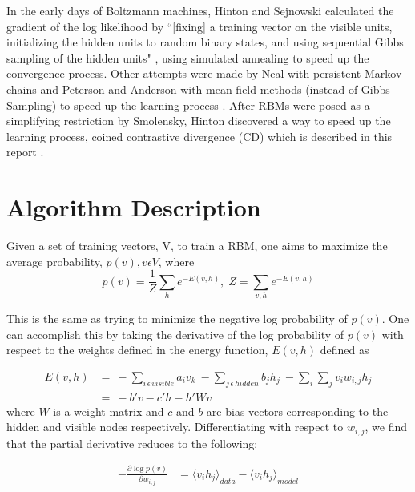\documentclass[journal]{IEEEtran}
\begin{document}
In the early days of Boltzmann machines, Hinton and Sejnowski calculated the gradient of the log likelihood by ``[fixing] a training vector on the visible units, initializing the hidden units to random binary states, and using sequential Gibbs sampling of the hidden units" \cite{ackley1985learning}, using simulated annealing to speed up the convergence process.  Other attempts were made by Neal with persistent Markov chains \cite{neal1992connectionist} and Peterson and Anderson with mean-field methods (instead of Gibbs Sampling) to speed up the learning process \cite{peterson1987mean}. After RBMs were posed as a simplifying restriction by Smolensky, Hinton discovered a way to speed up the learning process, coined contrastive divergence (CD) which is described in this report \cite{carreira2005contrastive,hinton2006fast,hinton2010practical}.  


\section{Algorithm Description}
Given a set of training vectors, V, to train a RBM, one aims to maximize the average probability, $p(v), v \epsilon V$, where
\begin{equation}
p(v) = \frac{1}{Z} \sum\limits_{h} e^{-E(v,h)},\;
Z = \sum\limits_{v,h} e^{-E(v,h)}
\end{equation}

This is the same as trying to minimize the negative log probability of $p(v)$. One can accomplish this by taking the derivative of the log probability of $p(v)$ with respect to the weights defined in the energy function, $E(v,h)$ defined as

\begin{equation}
\begin{aligned}
E(v,h) &= \:- \sum\limits_{i \, \epsilon \, visible} a_{i}v_{k} \: - \sum\limits_{j \, \epsilon \, hidden} b_{j}h_{j} \: - \sum\limits_{i}\sum\limits_{j} v_{i}w_{i,j}h_{j}\\
&=\: -b'v - c'h - h'Wv
\end{aligned}
\end{equation} where $W$ is a weight matrix and $c$ and $b$ are bias vectors corresponding to the hidden and visible nodes respectively. Differentiating with respect to $w_{i,j}$, we find that the partial derivative reduces to the following:

\begin{equation}
\begin{aligned}
-\frac{\partial \log p(v)}{\partial w_{i,j}} & = {\langle v_{i} h_{j} \rangle}_{data} - {\langle v_{i} h_{j} \rangle}_{model} \\
\end{aligned}
\end{equation}
\end{document}
